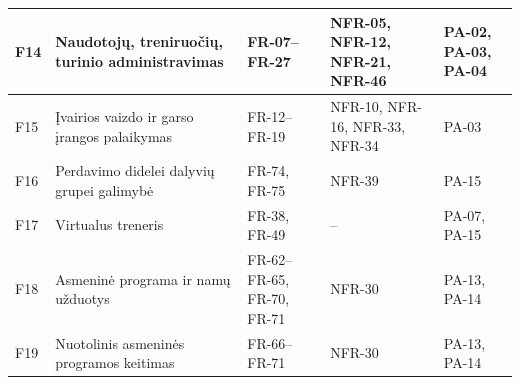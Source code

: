 \begin{table}[H]
\begin{tabularx}{\textwidth}{p{0.8cm} p{3.3cm} p{2.2cm} X p{2.2cm}}
F14 & Naudotojų, treniruočių, turinio administravimas & FR-07--FR-27 & NFR-05, NFR-12, NFR-21, NFR-46 & PA-02, PA-03, PA-04 \\ \hline
F15 & Įvairios vaizdo ir garso įrangos palaikymas & FR-12--FR-19 & NFR-10, NFR-16, NFR-33, NFR-34 & PA-03 \\ \hline
F16 & Perdavimo didelei dalyvių grupei galimybė & FR-74, FR-75 & NFR-39 & PA-15 \\ \hline
F17 & Virtualus treneris & FR-38, FR-49 & -- & PA-07, PA-15 \\ \hline
F18 & Asmeninė programa ir namų užduotys & FR-62--FR-65, FR-70, FR-71 & NFR-30 & PA-13, PA-14 \\ \hline
F19 & Nuotolinis asmeninės programos keitimas & FR-66--FR-71 & NFR-30 & PA-13, PA-14 \\ \hline
\end{tabularx}
\label{tab:atsekamumas}
\end{table}